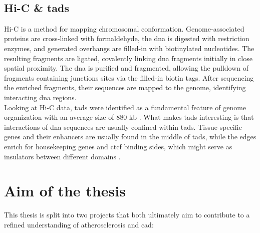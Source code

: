     \subsection{Hi-C \& \acsp{tad}}
    Hi-C is a method for mapping chromosomal conformation. Genome-associated proteins are cross-linked with formaldehyde, the \ac{dna} is digested with restriction enzymes, and generated overhangs are filled-in with biotinylated nucleotides. The resulting fragments are ligated, covalently linking \ac{dna} fragments initially in close spatial proximity. The \ac{dna} is purified and fragmented, allowing the pulldown of fragments containing junctions sites via the filled-in biotin tags. After sequencing the enriched fragments, their sequences are mapped to the genome, identifying interacting \ac{dna} regions. \cite{lieberman-aidenComprehensiveMappingLongRange2009, witDecade3CTechnologies2012}\\
    Looking at Hi-C data, \acp{tad} were identified as a fundamental feature of genome organization with an average size of 880 kb \cite{dixonTopologicalDomainsMammalian2012, wang3DGenomeBrowser2018}. What makes \acp{tad} interesting is that interactions of \ac{dna} sequences are usually confined within \acp{tad}. Tissue-specific genes and their enhancers are usually found in the middle of \acp{tad}, while the edges enrich for housekeeping genes and \ac{ctcf} binding sides, which might serve as insulators between different domains \cite{pomboThreedimensionalGenomeArchitecture2015}.


\section{Aim of the thesis}
\label{sec:Aim}
This thesis is split into two projects that both ultimately aim to contribute to a refined understanding of atherosclerosis and \ac{cad}:

